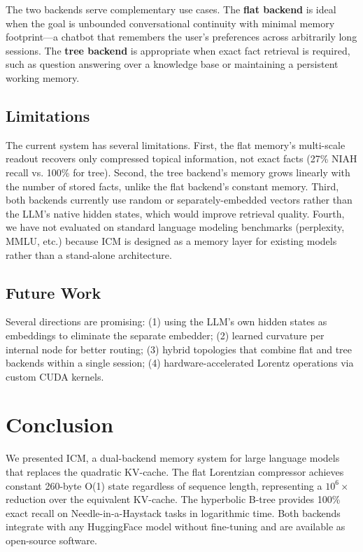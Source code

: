 \documentclass[conference]{IEEEtran}
\begin{document}
The two backends serve complementary use cases. The \textbf{flat backend} is ideal when the goal is unbounded conversational continuity with minimal memory footprint---a chatbot that remembers the user's preferences across arbitrarily long sessions. The \textbf{tree backend} is appropriate when exact fact retrieval is required, such as question answering over a knowledge base or maintaining a persistent working memory.

\subsection{Limitations}

The current system has several limitations. First, the flat memory's multi-scale readout recovers only compressed topical information, not exact facts (27\% NIAH recall vs. 100\% for tree). Second, the tree backend's memory grows linearly with the number of stored facts, unlike the flat backend's constant memory. Third, both backends currently use random or separately-embedded vectors rather than the LLM's native hidden states, which would improve retrieval quality. Fourth, we have not evaluated on standard language modeling benchmarks (perplexity, MMLU, etc.) because ICM is designed as a memory layer for existing models rather than a stand-alone architecture.

\subsection{Future Work}

Several directions are promising: (1) using the LLM's own hidden states as embeddings to eliminate the separate embedder; (2) learned curvature per internal node for better routing; (3) hybrid topologies that combine flat and tree backends within a single session; (4) hardware-accelerated Lorentz operations via custom CUDA kernels.

\section{Conclusion}

We presented ICM, a dual-backend memory system for large language models that replaces the quadratic KV-cache. The flat Lorentzian compressor achieves constant 260-byte O(1) state regardless of sequence length, representing a $10^6\times$ reduction over the equivalent KV-cache. The hyperbolic B-tree provides 100\% exact recall on Needle-in-a-Haystack tasks in logarithmic time. Both backends integrate with any HuggingFace model without fine-tuning and are available as open-source software.



\end{document}
